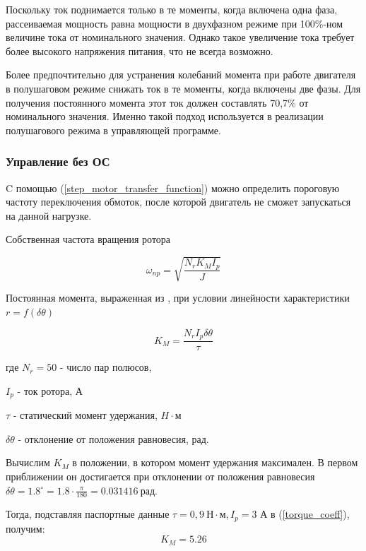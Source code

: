 Поскольку ток поднимается только в те моменты, когда включена одна фаза, рассеиваемая
мощность равна мощности в двухфазном режиме при 100\%-ном величине тока от
номинального значения. Однако такое увеличение тока требует более высокого
напряжения питания, что не всегда возможно.

Более предпочтительно для устранения колебаний момента при работе двигателя в
полушаговом режиме снижать ток в те моменты, когда включены две фазы. Для
получения постоянного момента этот ток должен составлять 70,7\% от номинального
значения. Именно такой подход используется в реализации полушагового режима
в управляющей программе.


\newpage
\subsubsection{Управление без ОС}
C помощью (\ref{step_motor_transfer_function}) можно определить пороговую
частоту переключения обмоток, после которой двигатель не сможет запускаться на данной нагрузке.

Собственная частота вращения ротора \cite[гл. 4.2, ф-ла 4.48]{Kenio}

\begin{equation}
    \label{rotor_natural_frequency}
    \omega_{np} = \sqrt{\frac{N_{r}K_{M}I_{p}}{J}}
\end{equation}

Постоянная момента, выраженная из \cite[гл. 4.2, ф-ла 4.52]{Kenio}, при условии
линейности характеристики $r = f(\delta\theta)$

\begin{equation}
    \label{torque_coeff}
    K_{M} = \frac{N_{r}I_{p}\delta\theta}{\tau}
\end{equation}

где $N_{r} = 50$ - число пар полюсов,

$I_{p}$ - ток ротора, А

$\tau$ - статический момент удержания, $H \cdot \textit{м}$

$\delta\theta$ - отклонение от положения равновесия, рад.
\newline

Вычислим $K_{M}$ в положении, в котором момент удержания максимален.
В первом приближении он достигается при отклонении от положения равновесия
$\delta\theta = 1.8^{\circ} = 1.8 \cdot \frac{\pi}{180} = 0.031416 ~\textit{рад}$.

Тогда, подставляя паспортные данные $\tau = 0,9 ~\textit{Н} \cdot \textit{м}, I_{p} = 3$ А
в (\ref{torque_coeff}), получим:
\begin{equation}
    \label{first_approximation_moment_coeff}
    K_{M} = 5.26
\end{equation}


